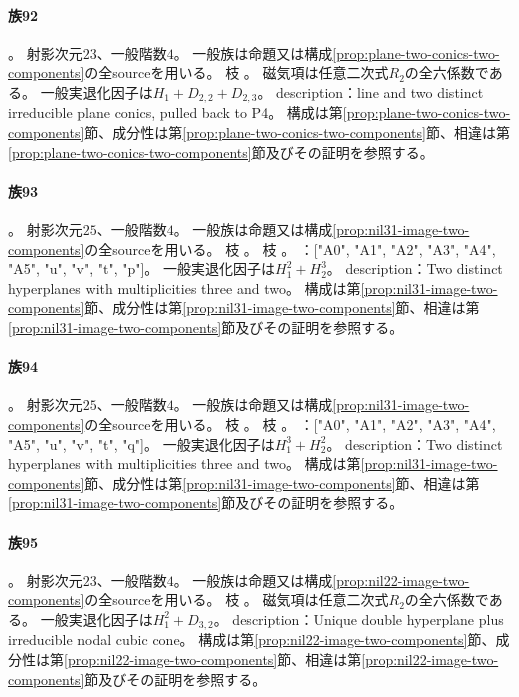 \paragraph{族92}\label{catalogue:R4_PLANE_TWO_CONICS_CONTACT4_TANGENT_23}
。
射影次元$23$、一般階数$4$。
一般族は命題又は構成\ref{prop:plane-two-conics-two-components}の全sourceを用いる。
枝 。
磁気項は任意二次式$R_2$の全六係数である。
一般実退化因子は$H_{1}+D_{2,2}+D_{2,3}$。
description：line and two distinct irreducible plane conics, pulled back to P4。
構成は第\ref{prop:plane-two-conics-two-components}節、成分性は第\ref{prop:plane-two-conics-two-components}節、相違は第\ref{prop:plane-two-conics-two-components}節及びその証明を参照する。

\paragraph{族93}\label{catalogue:R4_NIL31_IMAGE_HALF_25}
。
射影次元$25$、一般階数$4$。
一般族は命題又は構成\ref{prop:nil31-image-two-components}の全sourceを用いる。
枝 。
枝 。
：["A0", "A1", "A2", "A3", "A4", "A5", "u", "v", "t", "p"]。
一般実退化因子は$H_{1}^{2}+H_{2}^{3}$。
description：Two distinct hyperplanes with multiplicities three and two。
構成は第\ref{prop:nil31-image-two-components}節、成分性は第\ref{prop:nil31-image-two-components}節、相違は第\ref{prop:nil31-image-two-components}節及びその証明を参照する。

\paragraph{族94}\label{catalogue:R4_NIL31_IMAGE_THIRD_25}
。
射影次元$25$、一般階数$4$。
一般族は命題又は構成\ref{prop:nil31-image-two-components}の全sourceを用いる。
枝 。
枝 。
：["A0", "A1", "A2", "A3", "A4", "A5", "u", "v", "t", "q"]。
一般実退化因子は$H_{1}^{3}+H_{2}^{2}$。
description：Two distinct hyperplanes with multiplicities three and two。
構成は第\ref{prop:nil31-image-two-components}節、成分性は第\ref{prop:nil31-image-two-components}節、相違は第\ref{prop:nil31-image-two-components}節及びその証明を参照する。

\paragraph{族95}\label{catalogue:R4_NIL22_IMAGE_NODAL_CUBIC_FLEX_23}
。
射影次元$23$、一般階数$4$。
一般族は命題又は構成\ref{prop:nil22-image-two-components}の全sourceを用いる。
枝 。
磁気項は任意二次式$R_2$の全六係数である。
一般実退化因子は$H_{1}^{2}+D_{3,2}$。
description：Unique double hyperplane plus irreducible nodal cubic cone。
構成は第\ref{prop:nil22-image-two-components}節、成分性は第\ref{prop:nil22-image-two-components}節、相違は第\ref{prop:nil22-image-two-components}節及びその証明を参照する。


